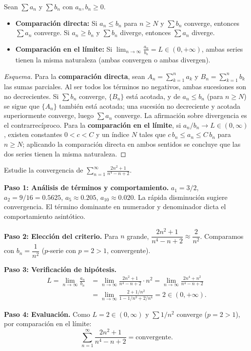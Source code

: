 \begin{theorem}
Sean $\sum a_n$ y $\sum b_n$ con $a_n, b_n \geq 0$.
\begin{itemize}
  \item \textbf{Comparación directa:} Si $a_n \leq b_n$ para $n \geq N$
        y $\sum b_n$ converge, entonces $\sum a_n$ converge. Si
        $a_n \geq b_n$ y $\sum b_n$ diverge, entonces $\sum a_n$ diverge.
  \item \textbf{Comparación en el límite:} Si $\displaystyle\lim_{n\to\infty}
        \frac{a_n}{b_n} = L \in (0,+\infty)$, ambas series tienen la misma
        naturaleza (ambas convergen o ambas divergen).
\end{itemize}
\end{theorem}

\begin{proof}[Esquema]
Para la \textbf{comparación directa}, sean $A_n=\sum_{k=1}^n a_k$ y
$B_n=\sum_{k=1}^n b_k$ las sumas parciales. Al ser todos los términos no
negativos, ambas sucesiones son no decrecientes. Si $\sum b_n$ converge,
$\{B_n\}$ está acotada, y de $a_n\leq b_n$ (para $n\geq N$) se sigue que
$\{A_n\}$ también está acotada; una sucesión no decreciente y acotada
superiormente converge, luego $\sum a_n$ converge. La afirmación sobre
divergencia es el contrarrecíproco. Para la \textbf{comparación en el límite},
si $a_n/b_n\to L\in(0,\infty)$, existen constantes $0<c<C$ y un índice $N$
tales que $c\,b_n\leq a_n\leq C\,b_n$ para $n\geq N$; aplicando la comparación
directa en ambos sentidos se concluye que las dos series tienen la misma
naturaleza.
\end{proof}

\begin{example}
Estudie la convergencia de $\displaystyle\sum_{n=1}^\infty
\frac{2n^2+1}{n^4-n+2}$.
\begin{myproof}
\textbf{Paso 1: Análisis de términos y comportamiento.}
$a_1 = 3/2$, $a_2 = 9/16 = 0.5625$, $a_5 \approx 0.205$,
$a_{10} \approx 0.020$. La rápida disminución sugiere convergencia. El
término dominante en numerador y denominador dicta el comportamiento
asintótico.

\textbf{Paso 2: Elección del criterio.}
Para $n$ grande, $\dfrac{2n^2+1}{n^4-n+2} \approx \dfrac{2}{n^2}$.
Comparamos con $b_n = \dfrac{1}{n^2}$ ($p$-serie con $p=2>1$, convergente).

\textbf{Paso 3: Verificación de hipótesis.}
\begin{align*}
  L = \lim_{n\to\infty}\frac{a_n}{b_n}
    &= \lim_{n\to\infty}\frac{2n^2+1}{n^4-n+2}\cdot n^2
     = \lim_{n\to\infty}\frac{2n^4+n^2}{n^4-n+2} \\
    &= \lim_{n\to\infty}\frac{2+1/n^2}{1-1/n^3+2/n^4} = 2 \in (0,+\infty).
\end{align*}

\textbf{Paso 4: Evaluación.}
Como $L = 2 \in (0,\infty)$ y $\sum 1/n^2$ converge ($p=2>1$), por
comparación en el límite:
\[
  \sum_{n=1}^\infty \frac{2n^2+1}{n^4-n+2} = \boxed{\text{convergente.}}
\]
\end{myproof}
\end{example}

